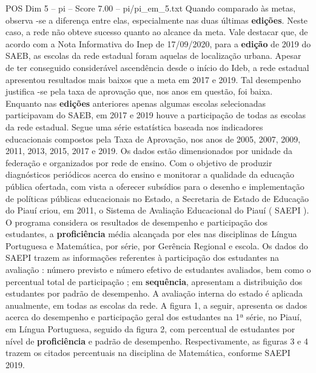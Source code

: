 \begin{textsample}{POS Dim 5 – pi – Score 7.00 – pi/pi\_em\_5.txt}
Quando comparado às metas, observa -se a diferença entre elas, especialmente nas duas últimas \textbf{edições}.
Neste caso, a rede não obteve sucesso quanto ao alcance da meta.
Vale destacar que, de acordo com a Nota Informativa do Inep de 17/09/2020, para a \textbf{edição} de 2019 do SAEB, as escolas da rede estadual foram aquelas de localização urbana.
Apesar de ter conseguido considerável ascendência desde o início do Ideb, a rede estadual apresentou resultados mais baixos que a meta em 2017 e 2019.
Tal desempenho justifica -se pela taxa de aprovação que, nos anos em questão, foi baixa.
Enquanto nas \textbf{edições} anteriores apenas algumas escolas selecionadas participavam do SAEB, em 2017 e 2019 houve a participação de todas as escolas da rede estadual.
Segue uma série estatística baseada nos indicadores educacionais compostos pela Taxa de Aprovação, nos anos de 2005, 2007, 2009, 2011, 2013, 2015, 2017 e 2019.
Os dados estão dimensionados por unidade da federação e organizados por rede de ensino.
Com o objetivo de produzir diagnósticos periódicos acerca do ensino e monitorar a qualidade da educação pública ofertada, com vista a oferecer subsídios para o desenho e implementação de políticas públicas educacionais no Estado, a Secretaria de Estado de Educação do Piauí criou, em 2011, o Sistema de Avaliação Educacional do Piauí ( SAEPI ).
O programa considera os resultados de desempenho e participação dos estudantes, a \textbf{proficiência} média alcançada por eles nas disciplinas de Língua Portuguesa e Matemática, por série, por Gerência Regional e escola.
Os dados do SAEPI trazem as informações referentes à participação dos estudantes na avaliação : número previsto e número efetivo de estudantes avaliados, bem como o percentual total de participação ; em \textbf{sequência}, apresentam a distribuição dos estudantes por padrão de desempenho.
A avaliação interna do estado é aplicada anualmente, em todas as escolas da rede.
A figura 1, a seguir, apresenta os dados acerca do desempenho e participação geral dos estudantes na 1ª série, no Piauí, em Língua Portuguesa, seguido da figura 2, com percentual de estudantes por nível de \textbf{proficiência} e padrão de desempenho.
Respectivamente, as figuras 3 e 4 trazem os citados percentuais na disciplina de Matemática, conforme SAEPI 2019.

\end{textsample}
